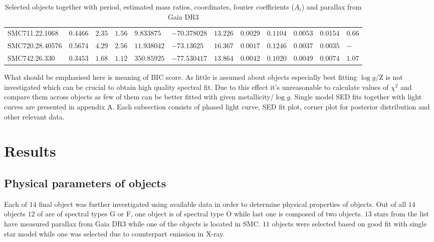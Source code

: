 \documentclass{pracalicmgr}
\begin{document}
\begin{table}[H]
{\begin{tabular}{llllllllllll}
    SMC711.22.1068  & $0.4466$  & $2.35$  & $1.56$ & $9.833875$   & $-70.378028$ & $13.226$ & $0.0029$  & $0.1104$ & $0.0053$  & $0.0154$ & $0.66$     \\[0.1cm]
    SMC720.28.40576 & $0.5674$ & $4.29$  & $2.56$ & $11.938042$  & $-73.13625$  & $16.367$  & $0.0017$ & $0.1246$ & $0.0037$  & $0.0035$ &  $-$    \\[0.1cm]
    SMC742.26.330   & $0.3453$ & $1.68$ & $1.12$ & $350.85925$  & $-77.530417$ & $13.864$ & $0.0042$   & $0.1020$ & $0.0049$ & $0.0074$ & $1.07$   \\[0.1cm]
    \hline
    \end{tabular}
    }
    \caption{Selected objects together with period, estimated mass ratios, coordinates, fourier coefficients ($A_i$) and parallax from Gaia DR3}\label{objects}
\end{table}
What should be emphasised here is meaning of BIC score. As little is assumed about objects especially best fitting 
$\log{g}$/Z is not investigated which can be crucial to obtain high quality spectral fit. Due to this effect it's unreasonable to calculate values of $\chi^2$ and compare them 
across objects as few of them can be better fitted with given metallicity/$\log{g}$.
Single model SED fits together with light curves are presented in appendix A. Each subsection consists of phased light curve, 
SED fit plot, corner plot for posterior distribution and other relevant data.
\chapter{Results}
\section{Physical parameters of objects}
Each of $14$ final object was further investigated using available data in order to determine physical properties of objects.
Out of all $14$ objects $12$ of are of spectral types G or F, one object is of spectral type O while last one is composed of two objects.
$13$ stars from the list have measured parallax from Gaia DR3 while one of the objects is located in SMC.
$11$ objects were selected based on good fit with single star model while one was selected due to counterpart emission in X-ray.
\end{document}
